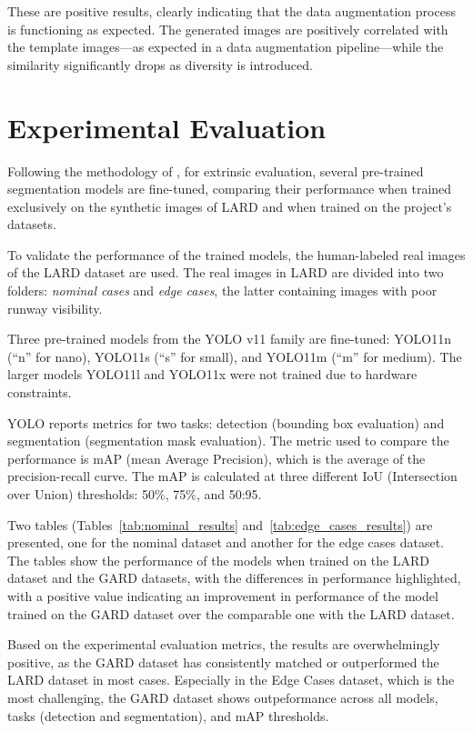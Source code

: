 These are positive results, clearly indicating that the data augmentation process is functioning as expected. 
The generated images are positively correlated with the template images---as expected in a data augmentation pipeline---while the similarity significantly drops as diversity is introduced.

\FloatBarrier
\section{Experimental Evaluation}

Following the methodology of \cite{voetman_big_2023}, for extrinsic evaluation, several pre-trained segmentation models are fine-tuned, comparing their performance when trained exclusively on the synthetic images of LARD \cite{ducoffe_lard_2023} and when trained on the project's datasets.

To validate the performance of the trained models, the human-labeled real images of the LARD dataset are used. The real images in LARD are divided into two folders: \emph{nominal cases} and \emph{edge cases}, the latter containing images with poor runway visibility.

Three pre-trained models from the YOLO v11 family are fine-tuned: YOLO11n (``n'' for nano), YOLO11s (``s'' for small), and YOLO11m (``m'' for medium). The larger models YOLO11l and YOLO11x were not trained due to hardware constraints.

YOLO reports metrics for two tasks: detection (bounding box evaluation) and
segmentation (segmentation mask evaluation). The metric used to compare the
performance is mAP (mean Average Precision), which is the average of the
precision-recall curve. The mAP is calculated at three different IoU (Intersection over Union) thresholds: 50\%, 75\%, and 50:95.

Two tables (Tables~\ref{tab:nominal_results} and~\ref{tab:edge_cases_results}) are presented, one for the nominal dataset and another for the edge
cases dataset. The tables show the performance of the models when trained on the
LARD dataset and the GARD datasets, with the differences in performance
highlighted, with a positive value indicating an improvement in performance of
the model trained on the GARD dataset over the comparable one with the LARD dataset.

Based on the experimental evaluation metrics, the results are overwhelmingly
positive, as the GARD dataset has consistently 
matched or outperformed the LARD dataset in most cases. Especially in the
Edge Cases dataset, which is the most challenging, the GARD dataset shows
outpeformance across all models, tasks (detection and segmentation), and mAP
thresholds.

